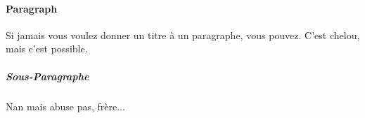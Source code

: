 \documentclass[titlepage, 12pt, openright]{report}
\begin{document}
						\paragraph{Paragraph}
							\begin{multicols}{2}
								Si jamais vous voulez donner un titre à un paragraphe, vous pouvez. C'est chelou, mais c'est possible.
							\end{multicols}
							
							\subparagraph{Sous-Paragraphe}
								\begin{multicols}{2}
									Nan mais abuse pas, frère...
								\end{multicols}
\end{document}

